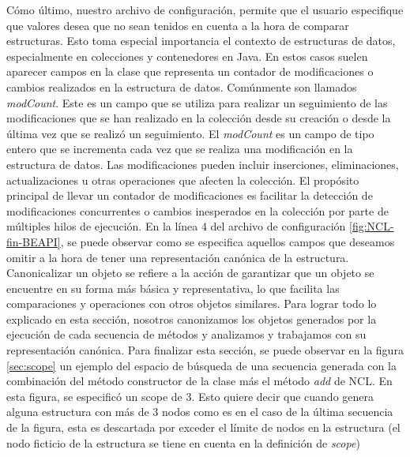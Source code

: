 Cómo último, nuestro archivo de configuración, permite que el usuario especifique que valores desea que no sean tenidos en cuenta a la hora de comparar estructuras. 
Esto toma especial importancia el contexto de estructuras de datos, especialmente en colecciones y contenedores en Java. En estos casos suelen aparecer campos en la clase que representa un contador de modificaciones o cambios realizados en la estructura de datos. Comúnmente son llamados \emph{modCount}. 
Este es un campo que se utiliza para realizar un seguimiento de las modificaciones que se han realizado en la colección desde su creación o desde la última vez que se realizó un seguimiento. 
El \emph{modCount} es un campo de tipo entero que se incrementa cada vez que se realiza una modificación en la estructura de datos. Las modificaciones pueden incluir inserciones, eliminaciones, actualizaciones u otras operaciones que afecten la colección. 
El propósito principal de llevar un contador de modificaciones es facilitar la detección de modificaciones concurrentes o cambios inesperados en la colección por parte de múltiples hilos de ejecución. 
En la línea 4 del archivo de configuración \ref{fig:NCL-fin-BEAPI}, se puede observar como se especifica aquellos campos que deseamos omitir a la hora de tener una representación canónica de la estructura. Canonicalizar un objeto se refiere a la acción de garantizar que un objeto se encuentre en su forma más básica y representativa, lo que facilita las comparaciones y operaciones con otros objetos similares.
Para lograr todo lo explicado en esta sección, nosotros canonizamos los objetos generados por la ejecución de cada secuencia de métodos y analizamos y trabajamos con su representación canónica.
Para finalizar esta sección, se puede observar en la figura \ref{sec:scope} un ejemplo del espacio de búsqueda de una secuencia generada con la combinación del método constructor de la clase más el método \emph{add} de NCL. En esta figura, se especificó un scope de 3. Esto quiere decir que cuando genera alguna estructura con más de 3 nodos como es en el caso de la última secuencia de la figura, esta es descartada por exceder el límite de nodos en la estructura (el nodo ficticio de la estructura se tiene en cuenta en la definición de \emph{scope})


